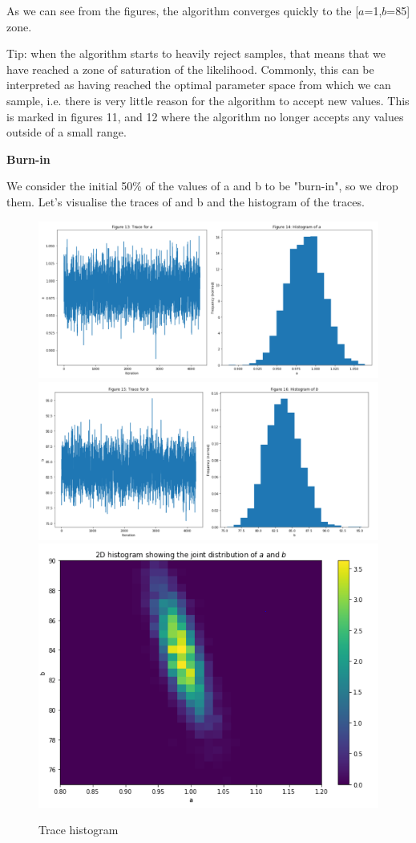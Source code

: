 As we can see from the figures, the algorithm converges quickly to the [$a$=1,$b$=85] zone.

Tip: when the algorithm starts to heavily reject samples, that means that we have reached a zone of saturation of the likelihood. Commonly, this can be interpreted as having reached the optimal parameter space from which we can sample, i.e. there is very little reason for the algorithm to accept new values. This is marked in figures 11, and 12 where the algorithm no longer accepts any values outside of a small range.

\textbf{Burn-in}

We consider the initial 50\% of the values of a and b to be "burn-in", so we drop them. Let's visualise the traces of and b and the histogram of the traces.


\begin{figure}[h]
    \centering
\includegraphics[width=.8\textwidth]{pic/p05c08-snip12}
\includegraphics[width=.8\textwidth]{pic/p05c08-snip13}
\includegraphics[width=.8\textwidth]{pic/p05c08-snip14}
    \caption{Trace histogram}
    \label{fig:p05c08-snip12}
\end{figure}


